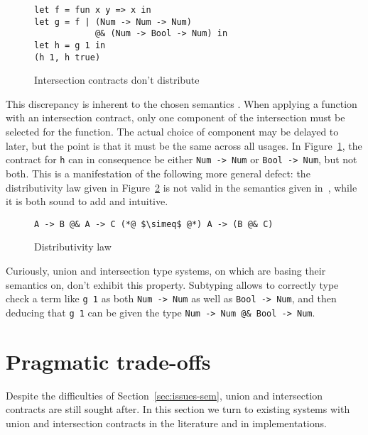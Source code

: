 \documentclass[sigplan,10pt,review,anonymous]{acmart}
\newcommand{\unsure}[2][1=]{}
\newcommand{\nickel}[1]{\lstinline[language=nickel]{#1}}
\begin{document}
\begin{figure}[h]
\begin{lstlisting}[language=nickel]
let f = fun x y => x in
let g = f | (Num -> Num -> Num)
            @& (Num -> Bool -> Num) in
let h = g 1 in
(h 1, h true)
\end{lstlisting}
\caption{Intersection contracts don't distribute}
\label{fig:intersection-distribution}
\end{figure}

This discrepancy is inherent to the chosen semantics .  When applying a function
with an intersection contract, only one component of the intersection must be
selected for the function. The actual choice of component may be delayed to
later, but the point is that it must be the same across all usages. In
Figure~\ref{fig:intersection-distribution}, the contract for \nickel{h} can in
consequence be either \nickel{Num -> Num} or \nickel{Bool -> Num}, but not both.
This is a manifestation of the following more general defect: the distributivity
law given in Figure~\ref{fig:distributivity-law} is not valid in the semantics
given in~\cite{KeilThiemannUnionIntersection}, while it is both sound to add and
intuitive.

\begin{figure}[h]
\begin{lstlisting}[language=nickel]
A -> B @& A -> C (*@ $\simeq$ @*) A -> (B @& C)
\end{lstlisting}
\caption{Distributivity law}
\label{fig:distributivity-law}
\end{figure}

Curiously, union and intersection type systems, on which
\cite{KeilThiemannUnionIntersection} are basing their semantics on, don't
exhibit this property. Subtyping allows to correctly type check a term like
\nickel{g 1} as both \nickel{Num -> Num} as well as
\nickel{Bool -> Num}, and then deducing that \nickel{g 1}
can be given the type \nickel{Num -> Num @& Bool -> Num}.
\unsure{(Yann) I just reworked the wording, but I'm not totally sold on the
argument}

\section{Pragmatic trade-offs}
\label{sec:issues-literature}

Despite the difficulties of Section~\ref{sec:issues-sem}, union and
intersection contracts are still sought after. In this section we turn
to existing systems with union and intersection contracts in the
literature and in implementations.
\end{document}
